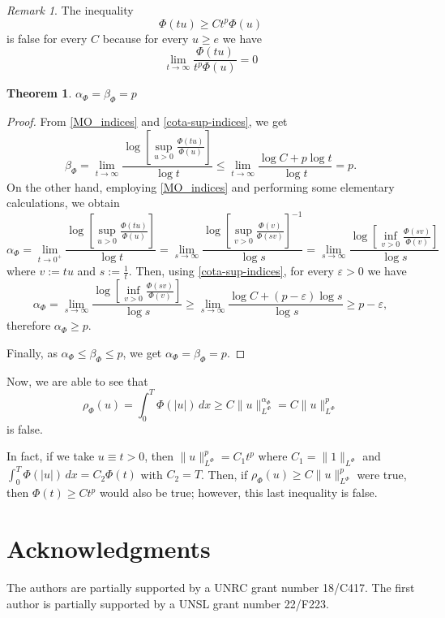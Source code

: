 \documentclass[twoside]{article}
\newtheorem{thm}{Theorem}[section]
\theoremstyle{remark}
\newtheorem{comentario}{Remark}
\newcommand{\orlnor}{\|_{L^{\Phi}}}
\renewcommand{\leq}{\leqslant}
\renewcommand{\geq}{\geqslant}
\begin{document}
\begin{comentario}
The inequality
\[
\Phi(tu)\geq Ct^p\Phi(u)
\]
is false for every $C$ because for every $u\geq e$ we have
\[
\lim\limits_{t \to \infty}\frac{\Phi(tu)}{t^p\Phi(u)}=0
\]
\end{comentario}






\begin{thm}
$\alpha_{\Phi}=\beta_{\Phi}=p$
\end{thm}

\begin{proof}
From \eqref{MO_indices} and \eqref{cota-sup-indices}, we get
\[
\beta_{\Phi}=\lim\limits_{t \to \infty} \frac{\log\left[\sup\limits_{u>0} \frac{\Phi(tu)}{\Phi(u)}\right]}{\log t}
\leq
\lim \limits_{t \to \infty} \frac{\log C+p\log t}{\log t}=p.
\]
On the other hand, employing \eqref{MO_indices} and performing some elementary calculations, we obtain
\[
\alpha_{\Phi}=
\lim\limits_{t \to 0^+} \frac{\log\left[\sup\limits_{u>0} \frac{\Phi(tu)}{\Phi(u)}\right]}{\log t}=
\lim\limits_{s \to \infty} \frac{\log\left[\sup\limits_{v>0} \frac{\Phi(v)}{\Phi(sv)}\right]^{-1}}{\log s}=
\lim\limits_{s \to \infty} \frac{\log\left[\inf\limits_{v>0} \frac{\Phi(sv)}{\Phi(v)}\right]}{\log s}
\]
where $v:=tu$ and $s:=\frac{1}{t}$.
Then, using \eqref{cota-sup-indices},  for every $\varepsilon>0$ we have
\[
\alpha_{\Phi}=
\lim\limits_{s \to \infty} \frac{\log\left[\inf\limits_{v>0} \frac{\Phi(sv)}{\Phi(v)}\right]}{\log s}\geq
\lim\limits_{s \to \infty} \frac{\log C+(p-\varepsilon)\log s}{\log s}\geq p-\varepsilon,
\]
therefore $\alpha_{\Phi}\geq p$.

Finally, as $\alpha_{\Phi}\leq \beta_{\Phi}\leq p$, we get
$\alpha_{\Phi}=\beta_{\Phi}=p$.
\end{proof}



Now, we are able to see that
\[
\rho_{\Phi}(u)=\int_0^T \Phi(|u|)\,dx\geq C\|u\orlnor^{\alpha_{\Phi}}=C\|u\orlnor^p
\]
is false.

In fact, if we take $u\equiv t>0$, then $\|u\orlnor^p=C_1t^p$ where $C_1=\|1\orlnor$ and
$\int_0^T \Phi(|u|)\,dx=C_2\Phi(t)$ with $C_2=T$.
Then, if $\rho_{\Phi}(u)\geq C\|u\orlnor^p$ were true, then $\Phi(t)\geq C t^p$ would also be true; however, this
last inequality is false.
 

\section*{Acknowledgments}
The authors are partially supported by a UNRC grant number 18/C417. The first author is  partially supported by a  UNSL grant number 22/F223. 


  
 
\end{document}
